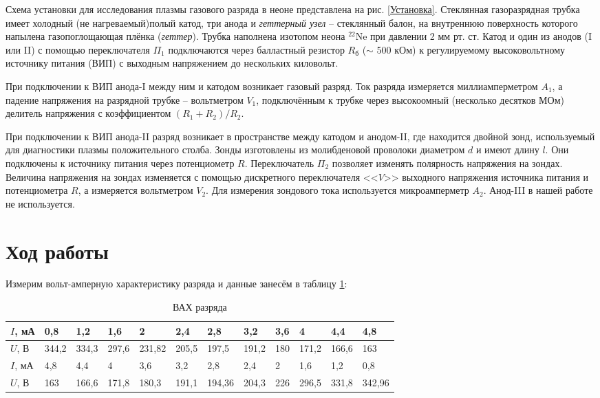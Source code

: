 \documentclass[a4paper, 12pt]{article}
\begin{document}
Схема установки для исследования плазмы газового разряда в неоне представлена на рис. \ref{Установка}. Стеклянная газоразрядная трубка имеет холодный (не нагреваемый)полый катод, три анода и \textit{геттерный узел} -- стеклянный балон, на внутреннюю поверхность которого напылена газопоглощающая плёнка (\textit{геттер}). Трубка наполнена изотопом неона $^{22}$Ne при давлении 2 мм рт. ст. Катод и один из анодов (I или II) с помощью переключателя $\Pi_1$ подключаются через балластный резистор $R_{б}$ ($\sim$ 500 кОм) к регулируемому высоковольтному источнику питания (ВИП) с выходным напряжением до нескольких киловольт. 

При подключении к ВИП анода-I между ним и катодом возникает газовый разряд. Ток разряда измеряется миллиамперметром $A_1$, а падение напряжения на разрядной трубке -- вольтметром $V_1$, подключённым к трубке через высокоомный (несколько десятков МОм) делитель напряжения с коэффициентом $(R_1+R_2)/R_2$.

При подключении к ВИП анода-II разряд возникает в пространстве между катодом и анодом-II, где находится двойной зонд, используемый для диагностики плазмы положительного столба. Зонды изготовлены из молибденовой проволоки диаметром $d$ и имеют длину $l$. Они подключены к источнику питания через потенциометр $R$. Переключатель $\Pi_2$ позволяет изменять полярность напряжения на зондах. Величина напряжения на зондах изменяется с помощью дискретного переключателя <<$V$>> выходного напряжения источника питания и потенциометра $R$, а измеряется вольтметром $V_2$. Для измерения зондового тока используется микроамперметр $A_2$. Анод-III в нашей работе не используется.

\section{Ход работы}

Измерим вольт-амперную характеристику разряда и данные занесём в таблицу \ref{ВАХ}:


\begin{table}[h]
\caption{ВАХ разряда}
\begin{tabular}{|l|l|l|l|l|l|l|l|l|l|l|l|}
\hline
$I$, мА & 0,8   & 1,2   & 1,6   & 2      & 2,4   & 2,8    & 3,2   & 3,6 & 4     & 4,4   & 4,8    \\ \hline
$U$, В  & 344,2 & 334,3 & 297,6 & 231,82 & 205,5 & 197,5  & 191,2 & 180 & 171,2 & 166,6 & 163    \\ \hline
$I$, мА & 4,8   & 4,4   & 4     & 3,6    & 3,2   & 2,8    & 2,4   & 2   & 1,6   & 1,2   & 0,8    \\ \hline
$U$, В  & 163   & 166,6 & 171,8 & 180,3  & 191,1 & 194,36 & 204,3 & 226 & 296,5 & 331,8 & 342,96 \\ \hline
\end{tabular}
\label{ВАХ}
\end{table}
\end{document}
